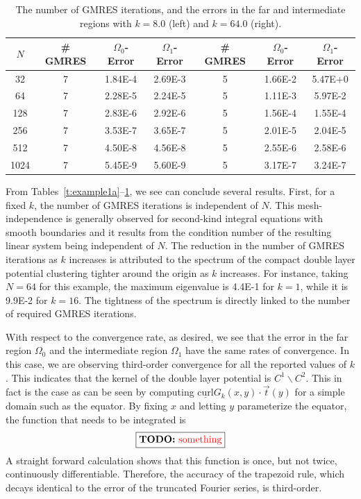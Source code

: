 \documentclass[final]{siamltex}
\newcommand{\todo}[1]{ \fbox{{\bf TODO:} \color{red} #1}}
\begin{document}
\begin{table}[htps]
\begin{tabular}{c|ccc|ccc}
$N$ & \# GMRES & $\Omega_{0}$-Error & $\Omega_{1}$-Error 
    & \# GMRES & $\Omega_{0}$-Error & $\Omega_{1}$-Error \\
\hline
32   & 7 & 1.84E-4 & 2.69E-3  
     & 5 & 1.66E-2 & 5.47E+0 \\
64   & 7 & 2.28E-5 & 2.24E-5
     & 5 & 1.11E-3 & 5.97E-2 \\
128  & 7 & 2.83E-6 & 2.92E-6 
     & 5 & 1.56E-4 & 1.55E-4 \\
256  & 7 & 3.53E-7 & 3.65E-7  
     & 5 & 2.01E-5 & 2.04E-5 \\
512  & 7 & 4.50E-8 & 4.56E-8  
     & 5 & 2.55E-6 & 2.58E-6 \\
1024 & 7 & 5.45E-9 & 5.60E-9 
     & 5 & 3.17E-7 & 3.24E-7 \\
\end{tabular}
\caption{\label{t:example1c} The number of GMRES iterations, and the
errors in the far and intermediate regions with $k = 8.0$ (left) and
$k=64.0$ (right).}

\end{table}

From Tables~\ref{t:example1a}--\ref{t:example1c}, we see can conclude
several results.  First, for a fixed $k$, the number of GMRES iterations
is independent of $N$.  This mesh-independence is generally observed for
second-kind integral equations with smooth boundaries and it results
from the condition number of the resulting linear system being
independent of $N$.  The reduction in the number of GMRES iterations as
$k$ increases is attributed to the spectrum of the compact double layer
potential clustering tighter around the origin as $k$ increases.  For
instance, taking $N=64$ for this example, the maximum eigenvalue is
4.4E-1 for $k=1$, while it is 9.9E-2 for $k=16$.  The tightness of the
spectrum is directly linked to the number of required GMRES iterations.

With respect to the convergence rate, as desired, we see that the error
in the far region $\Omega_{0}$ and the intermediate region $\Omega_{1}$
have the same rates of convergence.  In this case, we are observing
third-order convergence for all the reported values of $k$.  This
indicates that the kernel of the double layer potential is $C^{1}
\backslash C^{2}$.  This in fact is the case as can be seen by computing
$\underline{\mbox{curl}}G_{k}(x,y) \cdot \vec{t}(y)$ for a simple domain
such as the equator.  By fixing $x$ and letting $y$ parameterize the
equator, the function that needs to be integrated is 
\begin{align*}
  \todo{something}
\end{align*}
A straight forward calculation shows that this function is once, but not
twice, continuously differentiable.  Therefore, the accuracy of the
trapezoid rule, which decays identical to the error of the truncated
Fourier series, is third-order. \\
\end{document}
